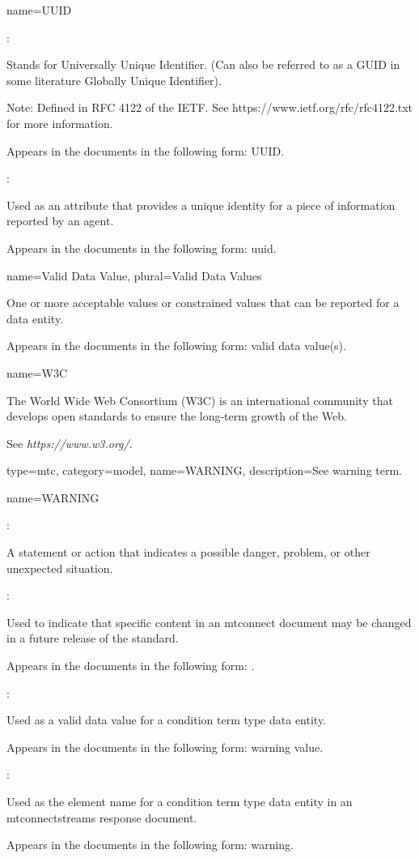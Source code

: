 {
  name={\normalfont UUID}
}
{
	:

	Stands for Universally Unique Identifier. (Can also be referred to as a GUID in some literature  Globally Unique Identifier).

	\begin{note}
	Note:  Defined in RFC 4122 of the IETF.  See https://www.ietf.org/rfc/rfc4122.txt for more information.
	\end{note}

	Appears in the documents in the following form: UUID.

	:

	Used as an attribute that provides a unique identity for a piece of information reported by an \gls{agent}.

	Appears in the documents in the following form: \gls{uuid}.
}


{
  name={Valid Data Value},
  plural={Valid Data Values}
}
{
	One or more acceptable values or constrained values that can be reported for a \gls{data entity}.

	Appears in the documents in the following form: \gls{valid data value}(s).
}


{
  name={\normalfont W3C}
}
{
	The World Wide Web Consortium (W3C) is an international community that develops open standards to ensure the long-term growth of the Web. 
	
	See \textit{https://www.w3.org/}.
}


{
  type=mtc,
  category=model,
  name={WARNING},
  description={See \gls{warning term}.}
}


{
  name={WARNING}
}
{
	:

	A statement or action that indicates a possible danger, problem, or other unexpected situation.

	:

	Used to indicate that specific content in an \gls{mtconnect document} may be changed in a future release of the standard.

	Appears in the documents in the following form: \WARNING.

	:

	Used as a \gls{valid data value} for a \gls{condition term} type \gls{data entity}.

	Appears in the documents in the following form: \gls{warning value}.

	:

	Used as the \gls{element name} for a \gls{condition term} type \gls{data entity} in an \gls{mtconnectstreams response document}.

	Appears in the documents in the following form: \gls{warning}.
}


